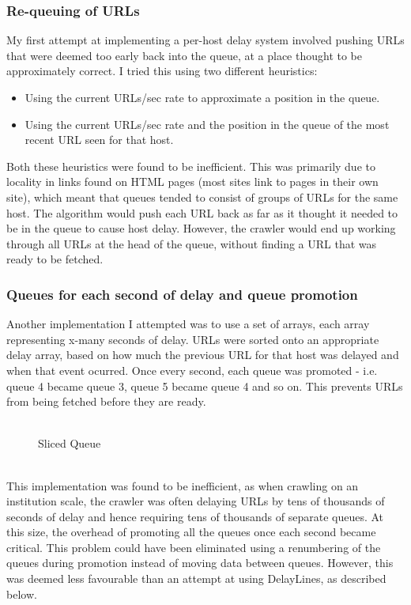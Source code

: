 \subsubsection{Re-queuing of URLs}
My first attempt at implementing a per-host delay system involved pushing URLs that were deemed too early back into the queue, at a place thought to be approximately correct. I tried this using two different heuristics:
\begin{itemize}
\item{Using the current URLs/sec rate to approximate a position in the queue.}
\item{Using the current URLs/sec rate and the position in the queue of the most recent URL seen for that host.}
\end{itemize}
Both these heuristics were found to be inefficient. This was primarily due to locality in links found on HTML pages (most sites link to pages in their own site\cite{ref17}), which meant that queues tended to consist of groups of URLs for the same host. The algorithm would push each URL back as far as it thought it needed to be in the queue to cause host delay. However, the crawler would end up working through all URLs at the head of the queue, without finding a URL that was ready to be fetched.

\subsubsection{Queues for each second of delay and queue promotion}
Another implementation I attempted was to use a set of arrays, each array representing x-many seconds of delay. URLs were sorted onto an appropriate delay array, based on how much the previous URL for that host was delayed and when that event ocurred. Once every second, each queue was promoted - i.e. queue 4 became queue 3, queue 5 became queue 4 and so on. This prevents URLs from being fetched before they are ready.\\
\ \\
\begin{figure}[h]
  \centerline{
  }
  \caption{Sliced Queue}
  \label{fig-slicedqueue}
\end{figure}
\ \\
This implementation was found to be inefficient, as when crawling on an institution scale, the crawler was often delaying URLs by tens of thousands of seconds of delay and hence requiring tens of thousands of separate queues. At this size, the overhead of promoting all the queues once each second became critical. This problem could have been eliminated using a renumbering of the queues during promotion instead of moving data between queues. However, this was deemed less favourable than an attempt at using DelayLines, as described below.

